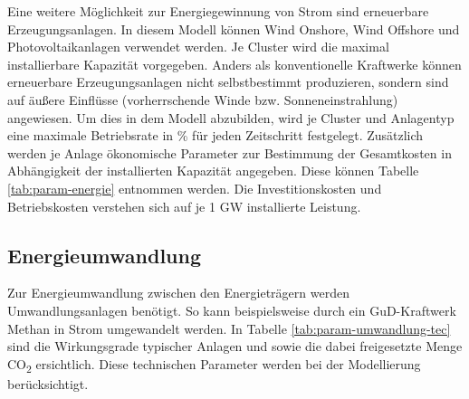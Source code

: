 Eine weitere Möglichkeit zur Energiegewinnung von Strom sind erneuerbare Erzeugungsanlagen. In diesem Modell können Wind Onshore, Wind Offshore und Photovoltaikanlagen verwendet werden. Je Cluster wird die maximal installierbare Kapazität vorgegeben. 
Anders als konventionelle Kraftwerke können erneuerbare Erzeugungsanlagen nicht selbstbestimmt produzieren, sondern sind auf äußere Einflüsse (vorherrschende Winde bzw. Sonneneinstrahlung) angewiesen. Um dies in dem Modell abzubilden, wird je Cluster und Anlagentyp eine maximale Betriebsrate in \% für jeden Zeitschritt festgelegt. Zusätzlich werden je Anlage ökonomische Parameter zur Bestimmung der Gesamtkosten in Abhängigkeit der installierten Kapazität angegeben. Diese können Tabelle \ref{tab:param-energie} entnommen werden. Die Investitionskosten und Betriebskosten verstehen sich auf je 1 GW installierte Leistung.


\subsection{Energieumwandlung}
Zur Energieumwandlung zwischen den Energieträgern werden Umwandlungsanlagen benötigt. So kann beispielsweise durch ein GuD-Kraftwerk Methan in Strom umgewandelt werden. In Tabelle \ref{tab:param-umwandlung-tec} sind die Wirkungsgrade typischer Anlagen und sowie die dabei freigesetzte Menge CO\textsubscript{2} ersichtlich. Diese technischen Parameter werden bei der Modellierung berücksichtigt.

